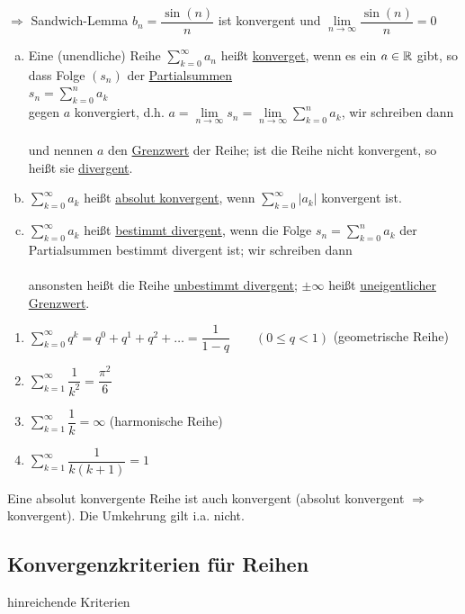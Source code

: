 $\Rightarrow$ Sandwich-Lemma $b_n = \dfrac{\sin(n)}{n}$ ist konvergent und $\lim\limits_{n\to\infty}\dfrac{\sin(n)}{n} = 0$

\Def
\begin{enumerate}[a)]
	\item Eine (unendliche) Reihe $\sum\limits_{k=0}^{\infty} a_n$ heißt \ul{konverget}, wenn es ein $a\in\mathbb{R}$ gibt, so dass Folge $(s_n)$ der \ul{Partialsummen}\\
	$s_n = \sum\limits_{k=0}^{n}a_k$\\
	gegen $a$ konvergiert, d.h. $a=\lim\limits_{n\to\infty}s_n = \lim\limits_{n\to\infty}\sum\limits_{k=0}^{n}a_k$, wir schreiben dann\\
	\\
	und nennen $a$ den \ul{Grenzwert} der Reihe; ist die Reihe nicht konvergent, so heißt sie \ul{divergent}.
	
	\item $\sum\limits_{k=0}^{\infty}a_k$ heißt \ul{absolut konvergent}, wenn $\sum\limits_{k=0}^{\infty}|a_k|$ konvergent ist.
	
	\item $\sum\limits_{k=0}^{\infty}a_k$ heißt \ul{bestimmt divergent}, wenn die Folge $s_n = \sum\limits_{k=0}^{n}a_k$ der Partialsummen bestimmt divergent ist; wir schreiben dann\\
	\\
	ansonsten heißt die Reihe \ul{unbestimmt divergent}; $\pm\infty$ heißt \ul{uneigentlicher Grenzwert}.
\end{enumerate}

\Bsp
\begin{enumerate}
	\item $\sum\limits_{k=0}^{\infty}q^k=q^0+q^1+q^2+\ldots = \dfrac{1}{1-q}\qquad(0\le q<1)$ (geometrische Reihe)
	\item $\sum\limits_{k=1}^{\infty}\dfrac{1}{k^2} = \dfrac{\pi^2}{6}$
	\item $\sum\limits_{k=1}^{\infty}\dfrac{1}{k} = \infty$ (harmonische Reihe)
	\item $\sum\limits_{k=1}^{\infty}\dfrac{1}{k(k+1)} = 1$
\end{enumerate}

\Bem Eine absolut konvergente Reihe ist auch konvergent (absolut konvergent $\Rightarrow$ konvergent). Die Umkehrung gilt i.a. nicht.

\subsection{Konvergenzkriterien für Reihen}
hinreichende Kriterien

